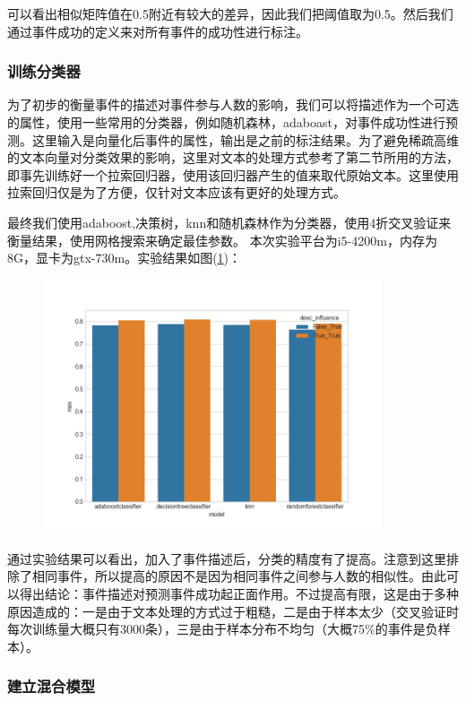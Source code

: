 \documentclass[12pt]{template}
\begin{document}
可以看出相似矩阵值在0.5附近有较大的差异，因此我们把阈值取为0.5。然后我们通过事件成功的定义来对所有事件的成功性进行标注。

\subsubsection{训练分类器}
为了初步的衡量事件的描述对事件参与人数的影响，我们可以将描述作为一个可选的属性，使用一些常用的分类器，例如随机森林，adaboast，对事件成功性进行预测。这里输入是向量化后事件的属性，输出是之前的标注结果。为了避免稀疏高维的文本向量对分类效果的影响，这里对文本的处理方式参考了第二节所用的方法，即事先训练好一个拉索回归器，使用该回归器产生的值来取代原始文本。这里使用拉索回归仅是为了方便，仅针对文本应该有更好的处理方式。

最终我们使用adaboost,决策树，knn和随机森林作为分类器，使用4折交叉验证来衡量结果，使用网格搜索来确定最佳参数。
本次实验平台为i5-4200m，内存为8G，显卡为gtx-730m。实验结果如图(\ref{f3})：

\begin{figure}
\centering
\includegraphics[width=10cm]{exp4_with_1.png}
\caption{}
\label{f3}
\end{figure}

通过实验结果可以看出，加入了事件描述后，分类的精度有了提高。注意到这里排除了相同事件，所以提高的原因不是因为相同事件之间参与人数的相似性。由此可以得出结论：事件描述对预测事件成功起正面作用。不过提高有限，这是由于多种原因造成的：一是由于文本处理的方式过于粗糙，二是由于样本太少（交叉验证时每次训练量大概只有3000条），三是由于样本分布不均匀（大概75\%的事件是负样本）。

\subsubsection{建立混合模型}
\end{document}
